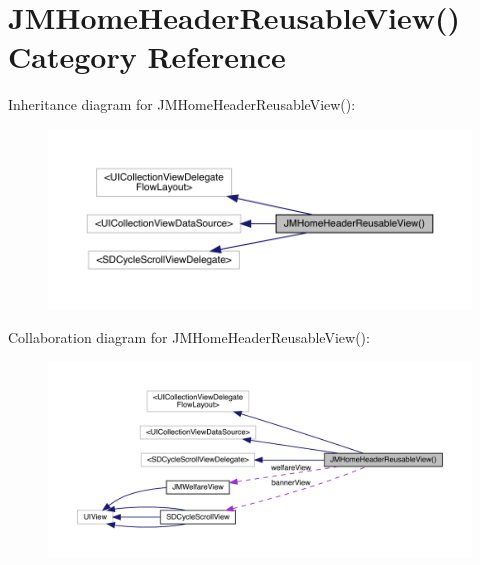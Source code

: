 \hypertarget{category_j_m_home_header_reusable_view_07_08}{}\section{J\+M\+Home\+Header\+Reusable\+View() Category Reference}
\label{category_j_m_home_header_reusable_view_07_08}


Inheritance diagram for J\+M\+Home\+Header\+Reusable\+View()\+:\nopagebreak
\begin{figure}[H]
\begin{center}
\leavevmode
\includegraphics[width=350pt]{category_j_m_home_header_reusable_view_07_08__inherit__graph}
\end{center}
\end{figure}


Collaboration diagram for J\+M\+Home\+Header\+Reusable\+View()\+:\nopagebreak
\begin{figure}[H]
\begin{center}
\leavevmode
\includegraphics[width=350pt]{category_j_m_home_header_reusable_view_07_08__coll__graph}
\end{center}
\end{figure}
